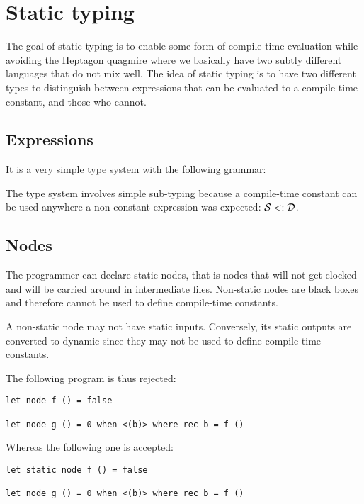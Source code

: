 \section{Static typing}

The goal of static typing is to enable some form of compile-time evaluation
while avoiding the Heptagon quagmire where we basically have two subtly
different languages that do not mix well. The idea of static typing is to have
two different types to distinguish between expressions that can be evaluated to
a compile-time constant, and those who cannot.

\subsection{Expressions}

It is a very simple type system with the following grammar:

The type system involves simple sub-typing because a compile-time constant can
be used anywhere a non-constant expression was expected: $\mathcal{S} \mathrel{<:} \mathcal{D}$.

\subsection{Nodes}

The programmer can declare static nodes, that is nodes that will not get clocked
and will be carried around in intermediate files. Non-static nodes are black
boxes and therefore cannot be used to define compile-time constants.

A non-static node may not have static inputs. Conversely, its static outputs are
converted to dynamic since they may not be used to define compile-time constants.

The following program is thus rejected:
\begin{verbatim}
let node f () = false

let node g () = 0 when <(b)> where rec b = f ()
\end{verbatim}
Whereas the following one is accepted:
\begin{verbatim}
let static node f () = false

let node g () = 0 when <(b)> where rec b = f ()
\end{verbatim}
